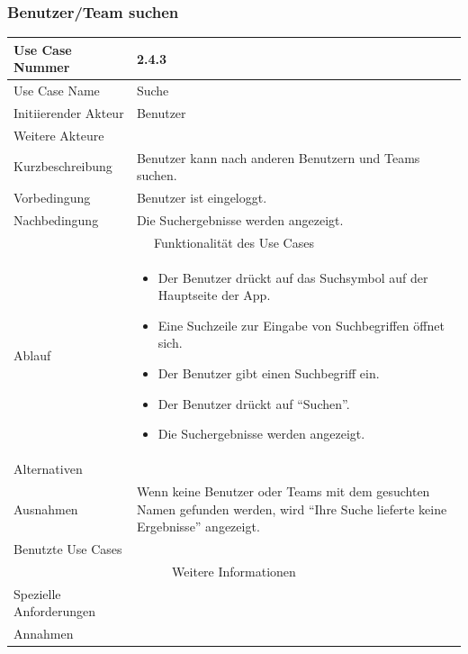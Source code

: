 \documentclass[10pt,a4paper]{article}
\begin{document}
\subsubsection{Benutzer/Team suchen}
	\begin{tabularx}{\textwidth}{|l|X|}
	\hline Use Case Nummer & 2.4.3 \\ 
	\hline Use Case Name & Suche \\ 
	\hline Initiierender Akteur & Benutzer \\
	\hline Weitere Akteure &  \\
	\hline Kurzbeschreibung & Benutzer kann nach anderen Benutzern und Teams suchen. \\
	\hline Vorbedingung & Benutzer ist eingeloggt. \\
	\hline Nachbedingung & Die Suchergebnisse werden angezeigt. \\
	\hline \multicolumn{2}{|c|}{Funktionalität des Use Cases}\\
	\hline Ablauf & \begin{itemize}
		\item Der Benutzer drückt auf das Suchsymbol auf der Hauptseite der App.
                \item Eine Suchzeile zur Eingabe von Suchbegriffen öffnet sich.
                \item Der Benutzer gibt einen Suchbegriff ein.
		\item Der Benutzer drückt auf ``Suchen''.
		\item Die Suchergebnisse werden angezeigt.
	\end{itemize} \\
	\hline Alternativen & \\
	\hline Ausnahmen & Wenn keine Benutzer oder Teams mit dem gesuchten Namen gefunden werden, wird ``Ihre Suche lieferte keine Ergebnisse'' angezeigt. \\
	\hline Benutzte Use Cases &  \\
	\hline \multicolumn{2}{|c|}{Weitere Informationen} \\
	\hline Spezielle Anforderungen &  \\
	\hline Annahmen &  \\
	\hline
	\end{tabularx}
\end{document}
